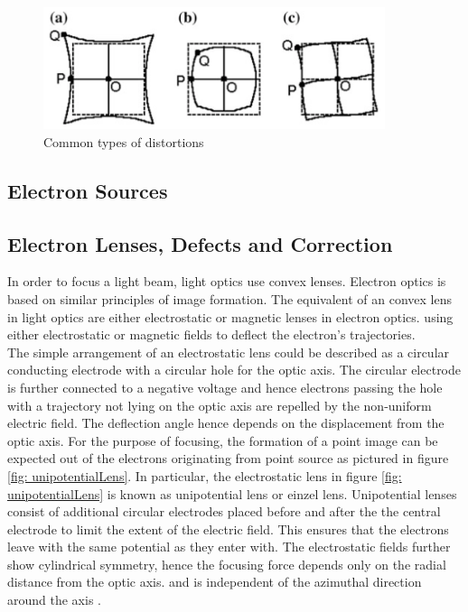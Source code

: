 \begin{figure}[!ht]
	\centering
	\includegraphics[width=10cm]{pictures/pictures_ch2/Distortions.png}
	\caption{Common types of distortions \cite[p.29]{EGERTON_2016}}
	\label{fig: commonDistortions}
\end{figure}

\subsection{Electron Sources}
\subsection{Electron Lenses, Defects and Correction}

In order to focus a light beam, light optics use convex lenses. Electron optics is based on similar principles of image formation. The equivalent of an convex lens in light optics are either electrostatic or magnetic lenses in electron optics. using either electrostatic or magnetic fields to deflect the electron's trajectories.\\

The simple arrangement of an electrostatic lens could be described as a circular conducting electrode with a circular hole for the optic axis. The circular electrode is further connected to a negative voltage and hence electrons passing the hole with a trajectory not lying on the optic axis are repelled by the non-uniform electric field. The deflection angle hence depends on the displacement from the optic axis. For the purpose of focusing, the formation of a point image can be expected out of the electrons originating from point source as pictured in figure \ref{fig: unipotentialLens}. In particular, the electrostatic lens in figure \ref{fig: unipotentialLens} is known as unipotential lens or einzel lens. Unipotential lenses consist of additional circular electrodes placed before and after the the central electrode to limit the extent of the electric field. This ensures that the electrons leave with the same potential as they enter with. The electrostatic fields further show cylindrical symmetry, hence the focusing force depends only on the radial distance from the optic axis. and is independent of the azimuthal direction around the axis \cite[p.33]{EGERTON_2016}.\\



